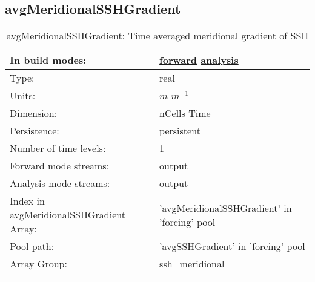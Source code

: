 \subsection[avgMeridionalSSHGradient]{avgMeridionalSSHGradient}
\label{subsec:var_sec_forcing_avgMeridionalSSHGradient}
\begin{center}
\begin{longtable}{| p{2.0in} | p{4.0in} |}
        \hline 
        In build modes: & \hyperref[subsec:forward_var_tab_forcing]{forward} \hyperref[subsec:analysis_var_tab_forcing]{analysis} \\
        \hline 
        Type: & real \\
        \hline 
        Units: & $m$ $m^{-1}$ \\
        \hline 
        Dimension: & nCells Time \\
        \hline 
        Persistence: & persistent \\
        \hline 
        Number of time levels: & 1 \\
        \hline 
		 Forward mode streams: &  output \\
        \hline 
		 Analysis mode streams: &  output \\
        \hline 
		 Index in avgMeridionalSSHGradient Array: & 'avgMeridionalSSHGradient' in 'forcing' pool \\
		 \hline 
            Pool path: & 'avgSSHGradient' in 'forcing' pool
 \\
		 \hline 
		 Array Group: & ssh\_meridional \\
		 \hline 
    \caption{avgMeridionalSSHGradient: Time averaged meridional gradient of SSH}
\end{longtable}
\end{center}
